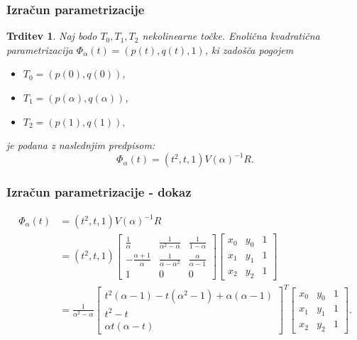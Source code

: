 \documentclass{beamer}
\newcommand{\al}{\alpha}
\newtheorem{trditev}{Trditev}
\begin{document}
\begin{frame}

\frametitle{Izračun parametrizacije}

\begin{trditev}\label{parametrizacija}
Naj bodo $T_0, T_1, T_2$  nekolinearne točke. Enolična kvadratična parametrizacija $\Phi_\al(t) = (p(t), q(t), 1)$, ki zadošča pogojem
\begin{itemize}
\item $T_0 = (p(0), q(0))$,
\item $T_1 = (p(\al), q(\al))$, 
\item $T_2 = (p(1), q(1)),$
\end{itemize} 
je podana z naslednjim predpisom:
$$ \Phi_\al(t) = (t^2, t, 1) V(\al)^{-1} R.$$

\end{trditev}

\end{frame}


\begin{frame}

\frametitle{Izračun parametrizacije - dokaz}

\begin{align*}
\Phi_\al(t) &=  (t^2, t, 1) V(\al)^{-1} R \\
				&=  (t^2, t, 1)  
\begin{bmatrix}
\frac{1}{\al} & \frac{1}{\al^2 - \al} & \frac{1}{1-\al} \\
- \frac{\al + 1}{\al} & \frac{1}{\al - \al^2} & \frac{\al}{\al-1} \\
1 & 0 & 0
\end{bmatrix}
\begin{bmatrix}
x_0 & y_0 & 1 \\
x_1 & y_1 & 1 \\
x_2 & y_2 & 1 
\end{bmatrix}
\\
				&= \frac{1}{\al^2 - \al} 
\begin{bmatrix}
t^2(\al - 1) - t(\al^2 - 1) + \al(\al - 1) \\
 t^2 - t \\
\al t(\al - t)
\end{bmatrix}
^T
\begin{bmatrix}
x_0 & y_0 & 1 \\
x_1 & y_1 & 1 \\
x_2 & y_2 & 1 
\end{bmatrix}
.\\
\end{align*}


\end{frame}
\end{document}
